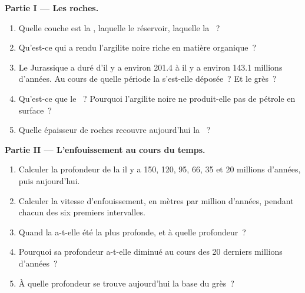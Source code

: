 \begin{problem}
\medskip
\noindent\textbf{Partie I --- Les roches.}
\begin{enumerate}
  \item Quelle couche est la , laquelle le réservoir, laquelle la
        ~?
  \item Qu'est-ce qui a rendu l'argilite noire riche en matière
        organique~?
  \item Le Jurassique a duré d'il y a environ \num{201.4} à il y a environ
        \num{143.1} millions d'années. Au cours de quelle période la  s'est-elle déposée~? Et le grès~?
  \item Qu'est-ce que le ~? Pourquoi l'argilite noire ne
        produit-elle pas de pétrole en surface~?
  \item Quelle épaisseur de roches recouvre aujourd'hui la ~?
\end{enumerate}

\medskip
\noindent\textbf{Partie II --- L'enfouissement au cours du temps.}
\begin{enumerate}[resume]
  \item Calculer la profondeur de la  il y a 150, 120, 95, 66, 35
        et 20 millions d'années, puis aujourd'hui.
  \item Calculer la vitesse d'enfouissement, en mètres par million
        d'années, pendant chacun des six premiers intervalles.
  \item Quand la  a-t-elle été la plus profonde, et à quelle
        profondeur~?
  \item Pourquoi sa profondeur a-t-elle diminué au cours des 20 derniers
        millions d'années~?
  \item À quelle profondeur se trouve aujourd'hui la base du grès~?
\end{enumerate}


\end{problem}
